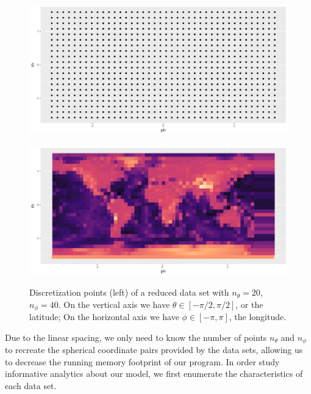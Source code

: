 \documentclass[a4paper]{article}
\theoremstyle{definition}
\begin{document}
\begin{figure}[h!]
    \centering
    \begin{minipage}{.5\textwidth}
      \centering
      \includegraphics[width=.95\textwidth]{media/discretized_grid.png}
      \label{fig:test1}
    \end{minipage}%
    \begin{minipage}{.5\textwidth}
      \centering
      \includegraphics[width=.95\textwidth]{media/discretized_reduced.png}
      \label{fig:test2}
    \end{minipage}
    \caption{Discretization points (left) of a reduced data set with $n_\theta = 20$, $n_\phi = 40$. On the vertical axis we have $\theta \in [-\pi/2, \pi/2]$, or the latitude; On 
    the horizontal axis we have $\phi \in [-\pi, \pi]$, the longitude.}
\end{figure}

Due to the linear spacing, we only need to know the number of points $n_\theta$ and $n_\phi$ to recreate the spherical coordinate pairs provided 
by the data sets, allowing us to decrease the running memory footprint of our program. In order study informative analytics about our model, we first enumerate
the characteristics of each data set.
\end{document}
